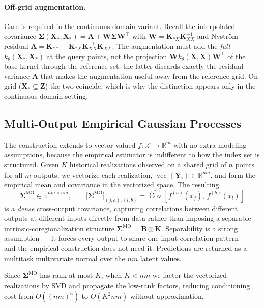 \documentclass[10pt]{article}
\newcommand{\bX}{\mathbf{X}}
\newcommand{\bZ}{\mathbf{Z}}
\newcommand{\bSigma}{\boldsymbol{\Sigma}}
\newcommand{\domain}{\mathcal{X}}
\begin{document}
\paragraph{Off-grid augmentation.}
Care is required in the continuous-domain variant. Recall the interpolated
covariance
$\bSigma(\bX_*,\bX_*) = \mathbf{A} + \mathbf{W}\bSigma\mathbf{W}^{\top}$ with
$\mathbf{W} = \mathbf{K}_{*X}\mathbf{K}_{XX}^{-1}$ and Nystr\"om residual
$\mathbf{A} = \mathbf{K}_{**} - \mathbf{K}_{*X}\mathbf{K}_{XX}^{-1}\mathbf{K}_{X*}$.
The augmentation must add the \emph{full} $k_\theta(\bX_*,\bX_*)$ at the query
points, not the projection $\mathbf{W}k_\theta(\bX,\bX)\mathbf{W}^{\top}$ of the
base kernel through the reference set; the latter discards exactly the residual
variance $\mathbf{A}$ that makes the augmentation useful away from the reference
grid. On-grid ($\bX_*\subseteq\bZ$) the two coincide, which is why the distinction
appears only in the continuous-domain setting.

\subsection{Multi-Output Empirical Gaussian Processes}
\label{apd:multioutput}

The construction extends to vector-valued $f:\domain\to\mathbb{R}^{m}$ with no extra
modeling assumptions, because the empirical estimator is indifferent to how the
index set is structured. Given $K$ historical realizations observed on a shared grid
of $n$ points for all $m$ outputs, we vectorize each realization,
$\operatorname{vec}(\mathbf{Y}_i)\in\mathbb{R}^{nm}$, and form the empirical mean and
covariance in the vectorized space. The resulting
\begin{equation}
    \bSigma^{\text{MO}} \in \mathbb{R}^{nm\times nm},
    \qquad
    \big[\bSigma^{\text{MO}}\big]_{(j,a),(l,b)}
    = \widehat{\operatorname{Cov}}\!\left[f^{(a)}(x_j),\, f^{(b)}(x_l)\right]
\end{equation}
is a \emph{dense} cross-output covariance, capturing correlations between different
outputs at different inputs directly from data rather than imposing a separable
intrinsic-coregionalization structure
$\bSigma^{\text{MO}} = \mathbf{B}\otimes\mathbf{K}$. Separability is a strong
assumption --- it forces every output to share one input correlation pattern --- and
the empirical construction does not need it. Predictions are returned as a multitask
multivariate normal over the $nm$ latent values.

Since $\bSigma^{\text{MO}}$ has rank at most $K$, when $K < nm$ we factor the
vectorized realizations by SVD and propagate the low-rank factors, reducing
conditioning cost from $O((nm)^3)$ to $O(K^2 nm)$ without approximation.
\end{document}
